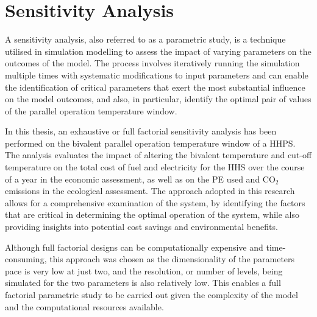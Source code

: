 \chapter{Sensitivity Analysis}\label{ch:sensitivity} 

A sensitivity analysis, also referred to as a parametric study, is a technique utilised in simulation modelling to assess the impact of varying parameters on the outcomes of the model. The process involves iteratively running the simulation multiple times with systematic modifications to input parameters and can enable the identification of critical parameters that exert the most substantial influence on the model outcomes, and also, in particular, identify the optimal pair of values of the parallel operation temperature window. 

In this thesis, an exhaustive or full factorial sensitivity analysis has been performed on the bivalent parallel operation temperature window of a \ac{HHPS}. The analysis evaluates the impact of altering the bivalent temperature and cut-off temperature on the total cost of fuel and electricity for the \ac{HHS} over the course of a year in the economic assessment, as well as on the \ac{PE} used and $\text{CO}_2$ emissions in the ecological assessment. The approach adopted in this research allows for a comprehensive examination of the system, by identifying the factors that are critical in determining the optimal operation of the system, while also providing insights into potential cost savings and environmental benefits.

Although full factorial designs can be computationally expensive and time-consuming, this approach was chosen as the dimensionality of the parameters pace is very low at just two, and the resolution, or number of levels, being simulated for the two parameters is also relatively low. This enables a full factorial parametric study to be carried out given the complexity of the model and the computational resources available.  